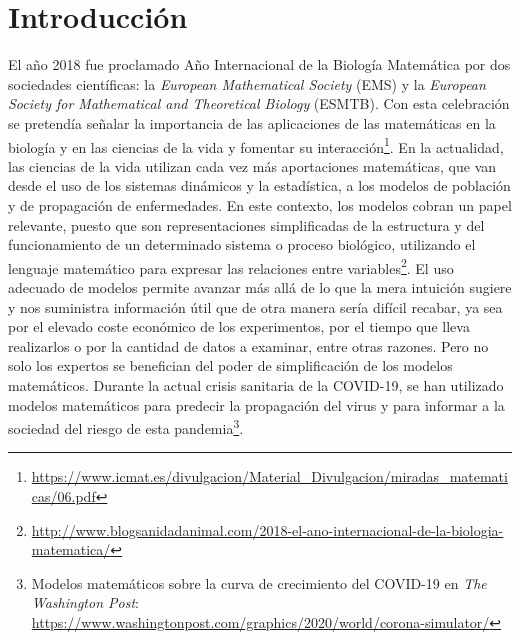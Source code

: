 \chapter{Introducción}
\label{cap:introduccion}


El año 2018 fue proclamado Año Internacional de la Biología Matemática por dos sociedades científicas: la \textit{European Mathematical Society} (EMS) y la \textit{European Society for Mathematical and Theoretical Biology} (ESMTB). Con esta celebración se pretendía señalar la importancia de las aplicaciones de las matemáticas en la biología y en las ciencias de la vida y fomentar su interacción\footnote{\url{https://www.icmat.es/divulgacion/Material_Divulgacion/miradas_matematicas/06.pdf}}. En la actualidad, las ciencias de la vida utilizan cada vez más aportaciones matemáticas, que van desde el uso de los sistemas dinámicos y la estadística, a los modelos de población y de propagación de enfermedades. En este contexto, los modelos cobran un papel relevante, puesto que son representaciones simplificadas de la estructura y del funcionamiento de un determinado sistema o proceso biológico, utilizando el lenguaje matemático para expresar las relaciones entre variables\footnote{\url{http://www.blogsanidadanimal.com/2018-el-ano-internacional-de-la-biologia-matematica/}}. El uso adecuado de modelos permite avanzar más allá de lo que la mera intuición sugiere y nos suministra información útil que de otra manera sería difícil recabar, ya sea por el elevado coste económico de los experimentos, por el tiempo que lleva realizarlos o por la cantidad de datos a examinar, entre otras razones. Pero no solo los expertos se benefician del poder de simplificación de los modelos matemáticos. Durante la actual crisis sanitaria de la COVID-19, se han utilizado modelos matemáticos para predecir la propagación del virus y para informar a la sociedad del riesgo de esta pandemia\footnote{Modelos matemáticos sobre la curva de crecimiento del COVID-19 en \textit{The Washington Post}: \url{https://www.washingtonpost.com/graphics/2020/world/corona-simulator/}}. 


